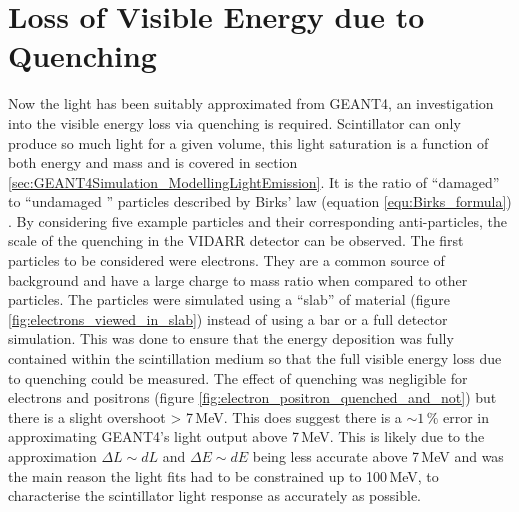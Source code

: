 \section{Loss of Visible Energy due to Quenching}\label{sec:GEANT4Simulation_quenchingLoss}
Now the light has been suitably approximated from GEANT4, an investigation into the visible energy loss via quenching is required. Scintillator can only produce so much light for a given volume, this light saturation is a function of both energy and mass and is covered in section \ref{sec:GEANT4Simulation_ModellingLightEmission}. It is the ratio of ``damaged'' to ``undamaged '' particles \cite{craun_1970} described by Birks' law (equation \ref{equ:Birks_formula}) \cite{knoll_2010}. By considering five example particles and their corresponding anti-particles, the scale of the quenching in the VIDARR detector can be observed. The first particles to be considered were electrons. They are a common source of background and have a large charge to mass ratio when compared to other particles. The particles were simulated using a ``slab'' of material (figure \ref{fig:electrons_viewed_in_slab}) instead of using a bar or a full detector simulation. This was done to ensure that the energy deposition was fully contained within the scintillation medium so that the full visible energy loss due to quenching could be measured. The effect of quenching was negligible for electrons and positrons (figure \ref{fig:electron_positron_quenched_and_not}) but there is a slight overshoot > 7\,MeV. This does suggest there is a $\sim 1\,\%$ error in approximating GEANT4's light output above 7\,MeV. This is likely due to the approximation $\Delta L \sim dL$ and $\Delta E \sim dE$  being less accurate above 7\,MeV and was the main reason the light fits had to be constrained up to 100\,MeV, to characterise the scintillator light response as accurately as possible. 

